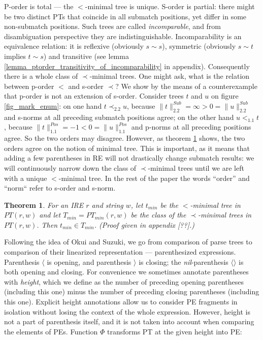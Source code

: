 \documentclass[AMA,STIX1COL]{WileyNJD-v2}
\newcommand{\Xl}{\langle}
\newcommand{\Xr}{\rangle}
\newcommand{\Xm}{\langle\!\rangle}
\newcommand{\PT}{PT}
\newcommand{\pnorm}[2]{\|{#1}\|^{Pos}_{#2}}
\newcommand{\snorm}[2]{\|{#1}\|^{Sub}_{#2}}
\newtheorem{XThe}{Theorem}
\begin{document}
P-order is total --- the $<$-minimal tree is unique.
S-order is partial:
there might be two distinct PTs that coincide in all submatch positions, yet differ in some non-submatch positions.
Such trees are called \emph{incomparable},
and from disambiguation perspective they are indistinguishable.
%
Incomparability is an equivalence relation: it is
reflexive (obviously $s \sim s$),
symmetric (obviously $s \sim t$ implies $t \sim s$) and
transitive (see lemma \ref{lemma_ptorder_transitivity_of_incomparability} in appendix).
Consequently there is a whole class of $\prec$-minimal trees.
%
One might ask, what is the relation between p-order $<$ and s-order $\prec$?
We show by the means of a counterexample that p-order is not an extension of s-order.
Consider trees $t$ and $u$ on figure \ref{fig_mark_enum}:
on one hand $t \prec_{2.2} u$, because $\snorm{t}{2.2} = \infty > 0 = \snorm{u}{2.2}$ and s-norms at all preceding submatch positions agree;
on the other hand $u <_{1.1} t$, because $\pnorm{t}{1.1} = -1 < 0 = \pnorm{u}{1.1}$
and p-norms at all preceding positions agree.
So the two orders may disagree.
However, as theorem \ref{theorem_order_compat} shows,
the two orders agree on the notion of minimal tree.
%
This is important, as it means that adding a few parentheses in RE will not drastically change submatch results:
we will continuously narrow down the class of $\prec$-minimal trees
until we are left with a unique $<$-minimal tree.
In the rest of the paper the words ``order'' and ``norm`` refer to s-order and s-norm.

    \begin{XThe}\label{theorem_order_compat}
    For an IRE $r$ and string $w$,
    let $t_{min}$ be the $<$-minimal tree in $\PT(r,w)$
    and let $T_{min} = \PT_{min}(r,w)$ be the class of the $\prec$-minimal trees in $\PT(r,w)$.
    Then $t_{min} \in T_{min}$.
    (Proof given in appendix [??].)
    \end{XThe}

Following the idea of Okui and Suzuki,
we go from comparison of parse trees to comparison of their linearized representation --- parenthesized expressions.
Parenthesis $\Xl$ is opening, and
parenthesis $\Xr$ is closing;
the \emph{nil}-parenthesis $\Xm$ is both opening and closing.
For convenience we sometimes annotate parentheses with \emph{height},
which we define as the number of preceding opening parentheses (including this one)
minus the number of preceding closing parentheses (including this one).
Explicit height annotations allow us to consider PE fragments in isolation
without losing the context of the whole expression.
However, height is not a part of parenthesis itself,
and it is not taken into account when comparing the elements of PEs.
Function $\Phi$ transforms PT at the given height into PE:
\end{document}
